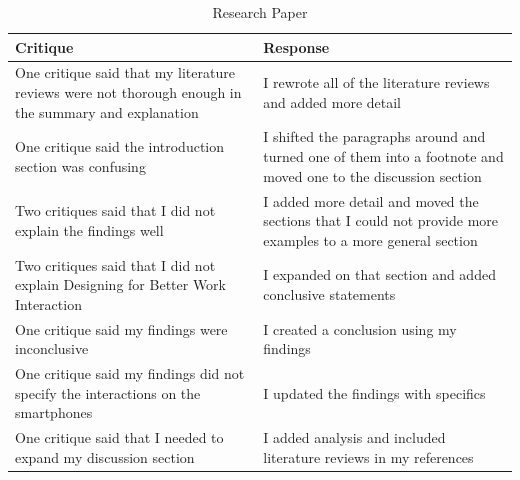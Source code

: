 \documentclass[letterpaper, 12pt]{report}
\begin{document}
\begin{table}[ht]
	\caption{Research Paper}
	\begin{tabular}{p{8cm} p{8cm}}
		\hline \hline
		Critique & Response\\
		\hline
		One critique said that my literature reviews were not thorough enough in the summary and explanation & I rewrote all of the literature reviews and added more detail\\
		One critique said the introduction section was confusing & I shifted the paragraphs around and turned one of them into a footnote and moved one to the discussion section\\
		Two critiques said that I did not explain the findings well & I added more detail and moved the sections that I could not provide more examples to a more general section\\
		Two critiques said that I did not explain Designing for Better Work Interaction & I expanded on that section and added conclusive statements\\
		One critique said my findings were inconclusive & I created a conclusion using my findings\\
		One critique said my findings did not specify the interactions on the smartphones & I updated the findings with specifics\\
		One critique said that I needed to expand my discussion section & I added analysis and included literature reviews in my references\\
		\hline
	\end{tabular}
\end{table}
\end{document}

